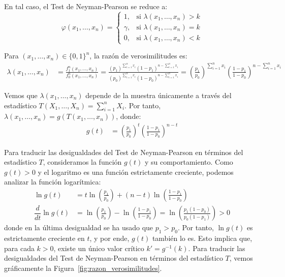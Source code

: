 \begin{ejemplo}
    En tal caso, el Test de Neyman-Pearson se reduce a:
    \begin{equation*}
        \varphi(x_1, \dots, x_n) =
        \begin{cases}
            1, & \text{si } \lambda(x_1, \dots, x_n) > k \\
            \gamma, & \text{si } \lambda(x_1, \dots, x_n) = k \\
            0, & \text{si } \lambda(x_1, \dots, x_n) < k
        \end{cases}
    \end{equation*}
    
    
    
    Para $(x_1, \dots, x_n) \in \{0,1\}^n$, la razón de verosimilitudes es:
    \begin{align*}
        \lambda(x_1, \dots, x_n) &= \frac{f_1^n(x_1, \dots, x_n)}{f_0^n(x_1, \dots, x_n)} = \frac{\left(p_1\right)^{\sum\limits_{i=1}^{n} x_i}\left(1-p_1\right)^{n-\sum\limits_{i=1}^{n} x_i}}{\left(p_0\right)^{\sum\limits_{i=1}^{n} x_i}\left(1-p_0\right)^{n-\sum\limits_{i=1}^{n} x_i}} = \left(\frac{p_1}{p_0}\right)^{\sum\limits_{i=1}^{n} x_i}\left(\frac{1-p_1}{1-p_0}\right)^{n-\sum\limits_{i=1}^{n} x_i}
    \end{align*}

    Vemos que $\lambda(x_1, \dots, x_n)$ depende de la muestra únicamente a través del estadístico $T(X_1, \dots, X_n) = \sum\limits_{i=1}^{n} X_i$. Por tanto, $\lambda(x_1, \dots, x_n) = g(T(x_1, \dots, x_n))$, donde:
    \begin{align*}
        g(t) &= \left(\frac{p_1}{p_0}\right)^{t}\left(\frac{1-p_1}{1-p_0}\right)^{n-t}
    \end{align*}

    Para traducir las desigualdades del Test de Neyman-Pearson en términos del estadístico $T$, consideramos la función $g(t)$ y su comportamiento. Como $g(t)>0$ y el logaritmo es una función estrictamente creciente, podemos analizar la función logarítmica:
    \begin{align*}
        \ln g(t) &= t \ln\left(\frac{p_1}{p_0}\right) + (n-t) \ln\left(\frac{1-p_1}{1-p_0}\right)\\
        \dfrac{d}{dt} \ln g(t) &= \ln\left(\frac{p_1}{p_0}\right) - \ln\left(\frac{1-p_1}{1-p_0}\right) = \ln\left(\frac{p_1(1-p_0)}{p_0(1-p_1)}\right)>0
    \end{align*}
    donde en la última desigualdad se ha usado que $p_1>p_0$. Por tanto, $\ln g(t)$ es estrictamente creciente en $t$, y por ende, $g(t)$ también lo es. Esto implica que, para cada $k>0$, existe un único valor crítico $k'=g^{-1}(k)$. Para traducir las desigualdades del Test de Neyman-Pearson en términos del estadístico $T$, vemos gráficamente la Figura~\ref{fig:razon_verosimilitudes}.
    \begin{figure}[ht]
        \centering
        \begin{tikzpicture}[>=Stealth, scale=1.15]


\end{tikzpicture}
\end{figure}
\end{ejemplo}
